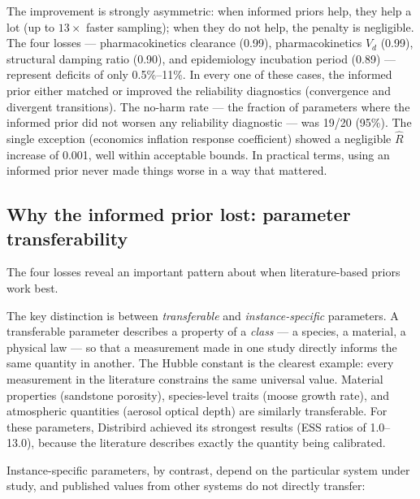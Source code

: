 \documentclass[11pt,a4paper]{article}
\begin{document}
The improvement is strongly asymmetric: when informed priors help, they help a lot (up to $13\times$ faster sampling); when they do not help, the penalty is negligible. The four losses --- pharmacokinetics clearance (0.99), pharmacokinetics $V_d$ (0.99), structural damping ratio (0.90), and epidemiology incubation period (0.89) --- represent deficits of only 0.5\%--11\%. In every one of these cases, the informed prior either matched or improved the reliability diagnostics (convergence and divergent transitions). The no-harm rate --- the fraction of parameters where the informed prior did not worsen any reliability diagnostic --- was 19/20 (95\%). The single exception (economics inflation response coefficient) showed a negligible $\hat{R}$ increase of 0.001, well within acceptable bounds. In practical terms, using an informed prior never made things worse in a way that mattered.

\subsection{Why the informed prior lost: parameter transferability}

The four losses reveal an important pattern about when literature-based priors work best.

The key distinction is between \emph{transferable} and \emph{instance-specific} parameters. A transferable parameter describes a property of a \emph{class} --- a species, a material, a physical law --- so that a measurement made in one study directly informs the same quantity in another. The Hubble constant is the clearest example: every measurement in the literature constrains the same universal value. Material properties (sandstone porosity), species-level traits (moose growth rate), and atmospheric quantities (aerosol optical depth) are similarly transferable. For these parameters, Distribird achieved its strongest results (ESS ratios of 1.0--13.0), because the literature describes exactly the quantity being calibrated.

Instance-specific parameters, by contrast, depend on the particular system under study, and published values from other systems do not directly transfer:
\end{document}
